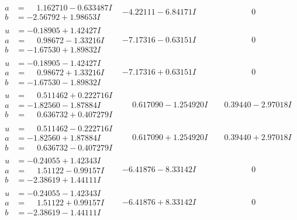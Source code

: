 \documentclass[1p]{elsarticle_modified}
\theoremstyle{definition}
\begin{document}
$$\begin{array}{c|c|c}
\begin{aligned}
a &= \phantom{-}1.162710 - 0.633487 I \\
b &= -2.56792 + 1.98653 I\end{aligned}
 & -4.22111 - 6.84171 I & \phantom{-0.000000 } 0 \\ \hline\begin{aligned}
u &= -0.18905 + 1.42427 I \\
a &= \phantom{-}0.98672 - 1.33216 I \\
b &= -1.67530 + 1.89832 I\end{aligned}
 & -7.17316 - 0.63151 I & \phantom{-0.000000 } 0 \\ \hline\begin{aligned}
u &= -0.18905 - 1.42427 I \\
a &= \phantom{-}0.98672 + 1.33216 I \\
b &= -1.67530 - 1.89832 I\end{aligned}
 & -7.17316 + 0.63151 I & \phantom{-0.000000 } 0 \\ \hline\begin{aligned}
u &= \phantom{-}0.511462 + 0.222716 I \\
a &= -1.82560 - 1.87884 I \\
b &= \phantom{-}0.636732 + 0.407279 I\end{aligned}
 & \phantom{-}0.617090 - 1.254920 I & \phantom{-}0.39440 - 2.97018 I \\ \hline\begin{aligned}
u &= \phantom{-}0.511462 - 0.222716 I \\
a &= -1.82560 + 1.87884 I \\
b &= \phantom{-}0.636732 - 0.407279 I\end{aligned}
 & \phantom{-}0.617090 + 1.254920 I & \phantom{-}0.39440 + 2.97018 I \\ \hline\begin{aligned}
u &= -0.24055 + 1.42343 I \\
a &= \phantom{-}1.51122 - 0.99157 I \\
b &= -2.38619 + 1.44111 I\end{aligned}
 & -6.41876 - 8.33142 I & \phantom{-0.000000 } 0 \\ \hline\begin{aligned}
u &= -0.24055 - 1.42343 I \\
a &= \phantom{-}1.51122 + 0.99157 I \\
b &= -2.38619 - 1.44111 I\end{aligned}
 & -6.41876 + 8.33142 I & \phantom{-0.000000 } 0\\

\end{array}$$
\end{document}
